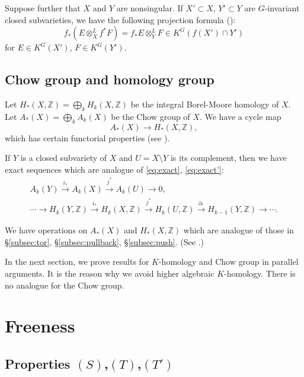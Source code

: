 \documentclass[12pt]{amsart}
\def\Bbb{\mathbb}
\theoremstyle{definition}
\theoremstyle{remark}
\numberwithin{equation}{subsection}
\newcommand{\subsecref}[1]{\S\ref{#1}}
\newcommand{\Z}{{\Bbb Z}}
\begin{document}
Suppose further that $X$ and $Y$ are nonsingular. If $X'\subset X$,
$Y'\subset Y$ are $G$-invariant closed subvarieties, we have the
following projection formula (\cite[5.3.13]{Gi-book}):
\begin{equation}
\label{eq:projection}
   f_*(E \otimes^L_X f^* F) = f_* E \otimes^L_Y F
   \in K^G\left(f(X')\cap Y'\right)
\end{equation}
for $E\in K^G(X')$, $F\in K^G(Y')$.

\subsection{Chow group and homology group}
Let $H_*(X,\Z) = \bigoplus_k H_k(X,\Z)$ be the integral Borel-Moore
homology of $X$. Let $A_*(X) = \bigoplus_k A_k(X)$ be the Chow group
of $X$. We have a cycle map
\begin{equation*}
   A_*(X) \to H_*(X,\Z),
\end{equation*}
which has certain functorial properties (see
\cite[Chapter~19]{Fulton}).

If $Y$ is a closed subvariety of $X$ and $U = X\setminus Y$ is its
complement, then we have exact sequences which are analogue of
\eqref{eq:exact}, \eqref{eq:exact'}:
\begin{gather}
   A_k(Y) \xrightarrow{i_*} A_k(X) \xrightarrow{j^*} A_k(U) \to 0,
   \label{eq:exact2}
\\
   \cdots \to H_k(Y,\Z) \xrightarrow{i_*} H_k(X,\Z) \xrightarrow{j^*}
   H_k(U,\Z) \xrightarrow{\partial_*} H_{k-1}(Y,\Z) \to
   \cdots.\label{eq:exact3}
\end{gather}

We have operations on $A_*(X)$ and $H_*(X,\Z)$ which are analogue of
those in \subsecref{subsec:tor}, \subsecref{subsec:pullback},
\subsecref{subsec:push}. (See \cite{Fulton}.)

In the next section, we prove results for $K$-homology and Chow group
in parallel arguments. It is the reason why we avoid higher algebraic
$K$-homology. There is no analogue for the Chow group.

\section{Freeness}\label{sec:freeness}

\subsection{Properties $(S)$,$(T)$,$(T')$}
\end{document}
